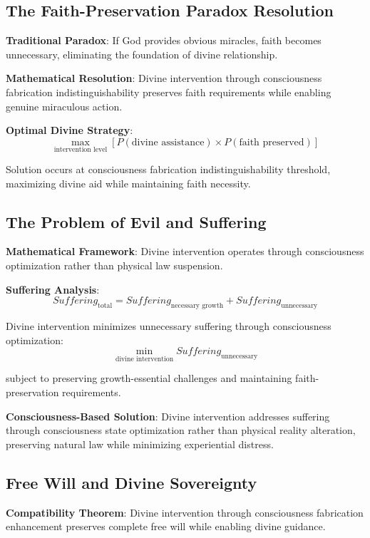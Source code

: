 \documentclass[12pt,a4paper]{article}
\begin{document}
\subsection{The Faith-Preservation Paradox Resolution}

\textbf{Traditional Paradox}: If God provides obvious miracles, faith becomes unnecessary, eliminating the foundation of divine relationship.

\textbf{Mathematical Resolution}: Divine intervention through consciousness fabrication indistinguishability preserves faith requirements while enabling genuine miraculous action.

\textbf{Optimal Divine Strategy}:
$$\max_{\text{intervention level}} [P(\text{divine assistance}) \times P(\text{faith preserved})]$$

Solution occurs at consciousness fabrication indistinguishability threshold, maximizing divine aid while maintaining faith necessity.

\subsection{The Problem of Evil and Suffering}

\textbf{Mathematical Framework}: Divine intervention operates through consciousness optimization rather than physical law suspension.

\textbf{Suffering Analysis}:
$$Suffering_{\text{total}} = Suffering_{\text{necessary growth}} + Suffering_{\text{unnecessary}}$$

Divine intervention minimizes unnecessary suffering through consciousness optimization:
$$\min_{\text{divine intervention}} Suffering_{\text{unnecessary}}$$

subject to preserving growth-essential challenges and maintaining faith-preservation requirements.

\textbf{Consciousness-Based Solution}: Divine intervention addresses suffering through consciousness state optimization rather than physical reality alteration, preserving natural law while minimizing experiential distress.

\subsection{Free Will and Divine Sovereignty}

\textbf{Compatibility Theorem}: Divine intervention through consciousness fabrication enhancement preserves complete free will while enabling divine guidance.
\end{document}
